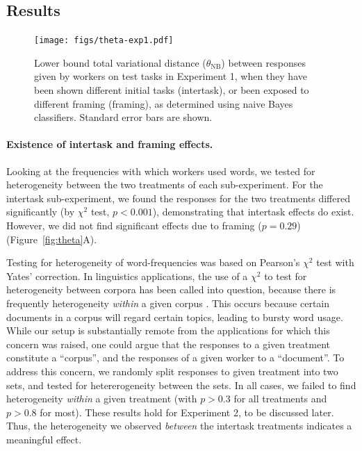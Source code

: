 \documentclass{sigchi}
\begin{document}
\subsection{Results}

\begin{figure}[t]
    \centering
	\texttt{[image: figs/theta-exp1.pdf]}
	\caption{
	    Lower bound total variational distance ($\theta_\mathrm{NB}$) 
		between responses given
		by workers on test tasks in Experiment 1, when they have been 
		shown different initial tasks (intertask), or been exposed to
		different framing (framing), as determined using naive Bayes 
		classifiers.  Standard error bars are shown.
	}
	\label{fig:theta-exp1}
\end{figure}

\paragraph{Existence of intertask and framing effects.} 
Looking at the frequencies with which workers used words, we tested for
heterogeneity between the two treatments of each sub-experiment.
For the intertask sub-experiment, we found the responses 
for the two treatments differed significantly 
(by $\chi^2$ test, $p<0.001$), 
demonstrating that intertask effects do exist.  However, we did not find 
significant effects due to framing ($p=0.29$) 
(Figure~\ref{fig:theta}A).

Testing for heterogeneity of word-frequencies was based on 
Pearson's $\chi^2$ test with Yates' correction.
In linguistics applications, the use of a $\chi^2$ to test for 
heterogeneity between corpora has been called
into question, because there is frequently heterogeneity \textit{within}
a given corpus \cite{kilgarriff1996comparing}.
This occurs because certain documents in a corpus will regard certain 
topics, leading to bursty word usage.  While our setup is substantially
remote from the applications for which this concern was raised, 
one could argue that the responses to a given treatment
constitute a ``corpus'', and the responses of a given worker to a 
``document''.
To address this concern, we randomly split responses to given treatment
into two sets, and tested for hetererogeneity between the sets.
In all cases, we failed to find heterogeneity \textit{within} a given 
treatment (with $p > 0.3$ for all treatments and $p > 0.8$ for most).
These results hold for Experiment 2, to be discussed later.
Thus, the heterogeneity we observed \textit{between} the intertask 
treatments indicates a meaningful effect.
\end{document}
